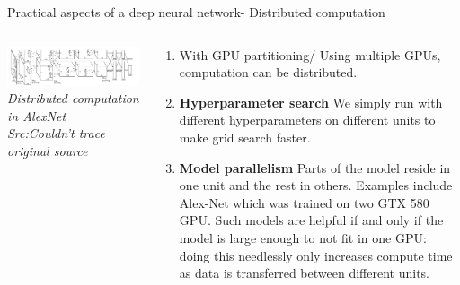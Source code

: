 \begin{frame}{Practical aspects of a deep neural network- Distributed computation}
	\begin{columns}[T]
        \begin{column}{0.4\textwidth}
        	\includegraphics[width=\textwidth]{images/GPU division.png}
			\tiny{\textit{Distributed computation in AlexNet\\ Src:Couldn't trace original source}}
        \end{column}
	    \begin{column}{0.6\textwidth} 
			\begin{enumerate}[$\bullet$]
				\item With GPU partitioning/ Using multiple GPUs, computation can be distributed. \pause
				\item \textbf{Hyperparameter search} We simply run with different hyperparameters on different units to make grid search faster.\pause
				\item  \textbf{Model parallelism} Parts of the model reside in one unit and the rest in others. Examples include Alex-Net which was trained on two GTX 580 GPU. Such models are helpful if and only if the model is large enough to not fit in one GPU: doing this needlessly only increases compute time as data is transferred between different units.
			\end{enumerate}
    	\end{column}
    \end{columns}
\end{frame}

